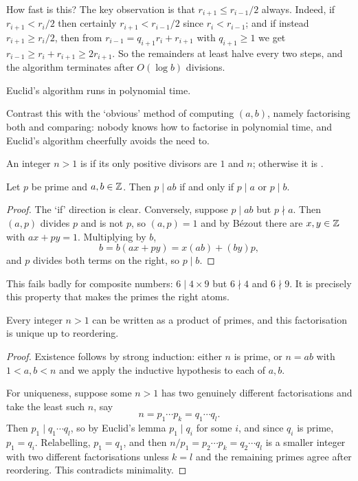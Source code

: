 \documentclass[a4paper]{scrartcl}
\begin{document}
How fast is this? The key observation is that $r_{i+1} \leq r_{i-1}/2$ always. Indeed, if $r_{i+1} < r_i/2$ then certainly $r_{i+1} < r_{i-1}/2$ since $r_i < r_{i-1}$; and if instead $r_{i+1} \geq r_i/2$, then from $r_{i-1} = q_{i+1}r_i + r_{i+1}$ with $q_{i+1} \geq 1$ we get $r_{i-1} \geq r_i + r_{i+1} \geq 2r_{i+1}$. So the remainders at least halve every two steps, and the algorithm terminates after $O(\log b)$ divisions.

\begin{corollary}
	Euclid's algorithm runs in polynomial time.
\end{corollary}

Contrast this with the `obvious' method of computing $(a,b)$, namely factorising both and comparing: nobody knows how to factorise in polynomial time, and Euclid's algorithm cheerfully avoids the need to.

\begin{definition}
	An integer $n > 1$ is  if its only positive divisors are $1$ and $n$; otherwise it is .
\end{definition}

\begin{lemma}
	Let $p$ be prime and $a, b \in \mathbb{Z}$. Then $p \mid ab$ if and only if $p \mid a$ or $p \mid b$.
\end{lemma}
\begin{proof}
	The `if' direction is clear. Conversely, suppose $p \mid ab$ but $p \nmid a$. Then $(a, p)$ divides $p$ and is not $p$, so $(a,p) = 1$ and by Bézout there are $x, y \in \mathbb{Z}$ with $ax + py = 1$. Multiplying by $b$,
	$$
	b = b(ax + py) = x(ab) + (by)p,
	$$
	and $p$ divides both terms on the right, so $p \mid b$.
\end{proof}

This fails badly for composite numbers: $6 \mid 4 \times 9$ but $6 \nmid 4$ and $6 \nmid 9$. It is precisely this property that makes the primes the right atoms.

\begin{theorem}
	Every integer $n > 1$ can be written as a product of primes, and this factorisation is unique up to reordering.
\end{theorem}
\begin{proof}
	Existence follows by strong induction: either $n$ is prime, or $n = ab$ with $1 < a, b < n$ and we apply the inductive hypothesis to each of $a, b$.

	For uniqueness, suppose some $n > 1$ has two genuinely different factorisations and take the least such $n$, say
	$$
	n = p_1 \cdots p_k = q_1 \cdots q_l.
	$$
	Then $p_1 \mid q_1 \cdots q_l$, so by Euclid's lemma $p_1 \mid q_i$ for some $i$, and since $q_i$ is prime, $p_1 = q_i$. Relabelling, $p_1 = q_1$, and then $n/p_1 = p_2 \cdots p_k = q_2 \cdots q_l$ is a smaller integer with two different factorisations unless $k = l$ and the remaining primes agree after reordering. This contradicts minimality.
\end{proof}
\end{document}
